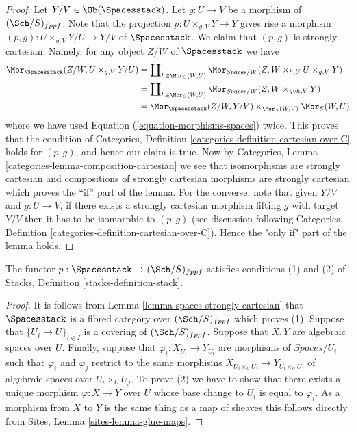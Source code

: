 \begin{proof}
Let $Y/V \in \Ob(\Spacesstack)$.
Let $g : U \to V$ be a morphism of $(\Sch/S)_{fppf}$.
Note that the projection $p : U \times_{g, V} Y \to Y$
gives rise a morphism
$(p, g) : U \times_{g, V} Y/U \to Y/V$ of $\Spacesstack$.
We claim that $(p, g)$ is strongly cartesian.
Namely, for any object $Z/W$ of $\Spacesstack$ we have
\begin{align*}
\Mor_{\Spacesstack}(Z/W, U \times_{g, V} Y/U)
& =
\coprod\nolimits_{h \in \Mor_S(W, U)}
\Mor_{\textit{Spaces}/W}(Z, W \times_{h, U} U \times_{g, V} Y) \\
& =
\coprod\nolimits_{h \in \Mor_S(W, U)}
\Mor_{\textit{Spaces}/W}(Z, W \times_{g \circ h, V} Y) \\
& =
\Mor_{\Spacesstack}(Z/W, Y/V)
\times_{\Mor_S(W, V)} \Mor_S(W, U)
\end{align*}
where we have used Equation (\ref{equation-morphisms-spaces}) twice.
This proves that the condition of
Categories, Definition \ref{categories-definition-cartesian-over-C}
holds for $(p, g)$, and hence our claim is true. Now by
Categories, Lemma \ref{categories-lemma-composition-cartesian}
we see that isomorphisms are strongly cartesian and
compositions of strongly cartesian morphisms are strongly cartesian
which proves the ``if'' part of the lemma. For the converse, note
that given $Y/V$ and $g : U \to V$, if there exists a
strongly cartesian morphism lifting $g$ with target $Y/V$
then it has to be isomorphic to $(p, g)$ (see discussion following
Categories, Definition \ref{categories-definition-cartesian-over-C}).
Hence the "only if" part of the lemma holds.
\end{proof}

\begin{lemma}
\label{lemma-pre-stack-of-spaces}
The functor $p : \Spacesstack \to (\Sch/S)_{fppf}$
satisfies conditions (1) and (2) of
Stacks, Definition \ref{stacks-definition-stack}.
\end{lemma}

\begin{proof}
It is follows from
Lemma \ref{lemma-spaces-strongly-cartesian}
that $\Spacesstack$ is a fibred category over $(\Sch/S)_{fppf}$
which proves (1).
Suppose that $\{U_i \to U\}_{i \in I}$ is a covering of
$(\Sch/S)_{fppf}$. Suppose that $X, Y$ are algebraic spaces over
$U$. Finally, suppose that $\varphi_i : X_{U_i} \to Y_{U_i}$ are morphisms
of $\textit{Spaces}/U_i$ such that $\varphi_i$ and $\varphi_j$ restrict
to the same morphisms $X_{U_i \times_U U_j} \to Y_{U_i \times_U U_j}$
of algebraic spaces over $U_i \times_U U_j$.
To prove (2) we have to show that there exists a unique morphism
$\varphi  : X \to Y$ over $U$ whose base change to $U_i$ is
equal to $\varphi_i$. As a morphism from $X$ to $Y$ is the same thing
as a map of sheaves this follows directly from
Sites, Lemma \ref{sites-lemma-glue-maps}.
\end{proof}

